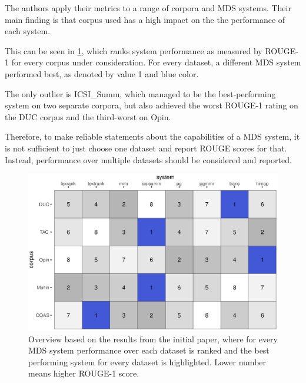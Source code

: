 \documentclass[20_original-paper.tex]{subfiles}
\begin{document}
The authors apply their metrics to a range of corpora and MDS systems. Their main finding is that corpus used has a high impact on the the performance of each system.

This can be seen in \ref{results}, which ranks system performance as measured by ROUGE-1 for every corpus under consideration. For every dataset, a different MDS system performed best, as denoted by value 1 and blue color.

The only outlier is ICSI\_Summ, which managed to be the best-performing system on two separate corpora, but also achieved the worst ROUGE-1 rating on the DUC corpus and the third-worst on Opin.


Therefore, to make reliable statements about the capabilities of a MDS system,
it is not sufficient to just choose one dataset and report ROUGE scores for that. Instead, performance over multiple datasets should be considered and reported.



\begin{figure}
    \includegraphics[width=\textwidth]{figures/results.eps}
    \caption{Overview based on the results from the initial paper, where for every MDS system performance over each dataset is ranked and the best performing system for every dataset is highlighted. Lower number means higher ROUGE-1 score.} \label{results}
\end{figure}
\end{document}
